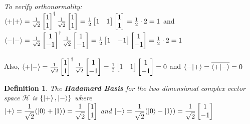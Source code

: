 \documentclass[12pt,twoside,fleqn]{report}
\makeatletter
\theoremstyle{thmstyle}
\renewenvironment{proof}[1][\proofname]{\par
\pushQED{\qed}%
\normalfont \topsep6\p@\@plus6\p@\relax
\trivlist
\item[\hskip\labelsep\itshape#1\@addpunct{.}]\mbox{}\par\nobreak\ignorespaces
}{%
    \popQED\endtrivlist\@endpefalse
    }
\newtheorem{defn}{Definition}[chapter]
\makeatother
\begin{document}
\begin{proof}
    \emph{To verify orthonormality:} \\
    $\braket{+|+} = \frac{1}{\sqrt{2}} \begin{bmatrix} 1 \\ 1 \end{bmatrix}^\dagger \frac{1}{\sqrt{2}} \begin{bmatrix} 1 \\ 1 \end{bmatrix} =  \frac{1}{2} \begin{bmatrix} 1 & 1 \end{bmatrix} \begin{bmatrix} 1 \\ 1 \end{bmatrix} = \frac{1}{2} \cdot 2 = 1$ 
    and $\braket{-|-} = \frac{1}{\sqrt{2}} \begin{bmatrix} 1 \\ -1 \end{bmatrix}^\dagger \frac{1}{\sqrt{2}} \begin{bmatrix} 1 \\ -1 \end{bmatrix} =  \frac{1}{2} \begin{bmatrix} 1 & -1 \end{bmatrix} \begin{bmatrix} 1 \\ -1 \end{bmatrix} = \frac{1}{2} \cdot 2 = 1$ 

    Also, $\braket{+|-} = \frac{1}{\sqrt{2}} \begin{bmatrix} 1 \\ 1 \end{bmatrix}^\dagger \frac{1}{\sqrt{2}} \begin{bmatrix} 1 \\ -1 \end{bmatrix} =  \frac{1}{2} \begin{bmatrix} 1 & 1 \end{bmatrix} \begin{bmatrix} 1 \\ -1 \end{bmatrix} = 0$  and $\braket{-|+} = \overline{\braket{+|-}} = 0$

\end{proof}

\begin{defn}
The \textbf{Hadamard Basis} for the two dimensional complex vector space $\mathcal{H}$ is  $\{ \ket{+}, \ket{-} \}$ where \\
    $\ket{+} = \displaystyle\frac{1}{\sqrt 2} (\ket{0} + \ket{1}) = \frac{1}{\sqrt{2}} \begin{bmatrix} 1 \\ 1 \end{bmatrix}$ and $\ket{-} = \displaystyle\frac{1}{\sqrt 2} (\ket{0} - \ket{1}) = \frac{1}{\sqrt{2}} \begin{bmatrix} 1 \\ -1 \end{bmatrix}$
\end{defn}
\end{document}
